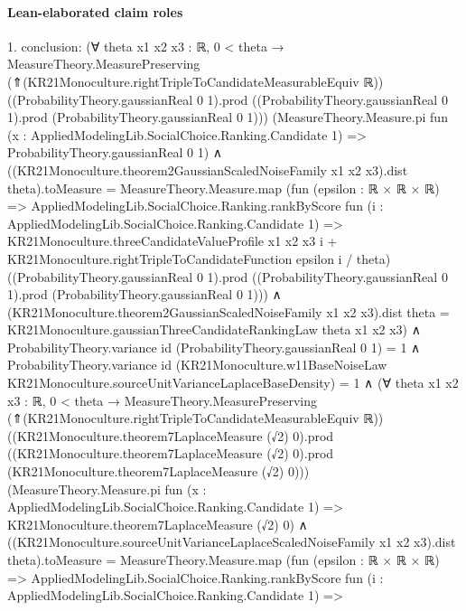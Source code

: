 \documentclass[10pt]{article}
\begin{document}
\paragraph{Lean-elaborated claim roles}\begin{ReviewVerbatim}
1. conclusion: (∀ {theta x1 x2 x3 : ℝ},
    0 < theta →
      MeasureTheory.MeasurePreserving (⇑(KR21Monoculture.rightTripleToCandidateMeasurableEquiv ℝ))
          ((ProbabilityTheory.gaussianReal 0 1).prod
            ((ProbabilityTheory.gaussianReal 0 1).prod (ProbabilityTheory.gaussianReal 0 1)))
          (MeasureTheory.Measure.pi fun (x : AppliedModelingLib.SocialChoice.Ranking.Candidate 1) =>
            ProbabilityTheory.gaussianReal 0 1) ∧
        ((KR21Monoculture.theorem2GaussianScaledNoiseFamily x1 x2 x3).dist theta).toMeasure =
            MeasureTheory.Measure.map
              (fun (epsilon : ℝ × ℝ × ℝ) =>
                AppliedModelingLib.SocialChoice.Ranking.rankByScore
                  fun (i : AppliedModelingLib.SocialChoice.Ranking.Candidate 1) =>
                  KR21Monoculture.threeCandidateValueProfile x1 x2 x3 i +
                    KR21Monoculture.rightTripleToCandidateFunction epsilon i / theta)
              ((ProbabilityTheory.gaussianReal 0 1).prod
                ((ProbabilityTheory.gaussianReal 0 1).prod (ProbabilityTheory.gaussianReal 0 1))) ∧
          (KR21Monoculture.theorem2GaussianScaledNoiseFamily x1 x2 x3).dist theta =
            KR21Monoculture.gaussianThreeCandidateRankingLaw theta x1 x2 x3) ∧
  ProbabilityTheory.variance id (ProbabilityTheory.gaussianReal 0 1) = 1 ∧
    ProbabilityTheory.variance id
          (KR21Monoculture.w11BaseNoiseLaw KR21Monoculture.sourceUnitVarianceLaplaceBaseDensity) =
        1 ∧
      (∀ {theta x1 x2 x3 : ℝ},
          0 < theta →
            MeasureTheory.MeasurePreserving (⇑(KR21Monoculture.rightTripleToCandidateMeasurableEquiv ℝ))
                ((KR21Monoculture.theorem7LaplaceMeasure (√2) 0).prod
                  ((KR21Monoculture.theorem7LaplaceMeasure (√2) 0).prod
                    (KR21Monoculture.theorem7LaplaceMeasure (√2) 0)))
                (MeasureTheory.Measure.pi fun (x : AppliedModelingLib.SocialChoice.Ranking.Candidate 1) =>
                  KR21Monoculture.theorem7LaplaceMeasure (√2) 0) ∧
              ((KR21Monoculture.sourceUnitVarianceLaplaceScaledNoiseFamily x1 x2 x3).dist theta).toMeasure =
                  MeasureTheory.Measure.map
                    (fun (epsilon : ℝ × ℝ × ℝ) =>
                      AppliedModelingLib.SocialChoice.Ranking.rankByScore
                        fun (i : AppliedModelingLib.SocialChoice.Ranking.Candidate 1) =>

\end{ReviewVerbatim}
\end{document}
